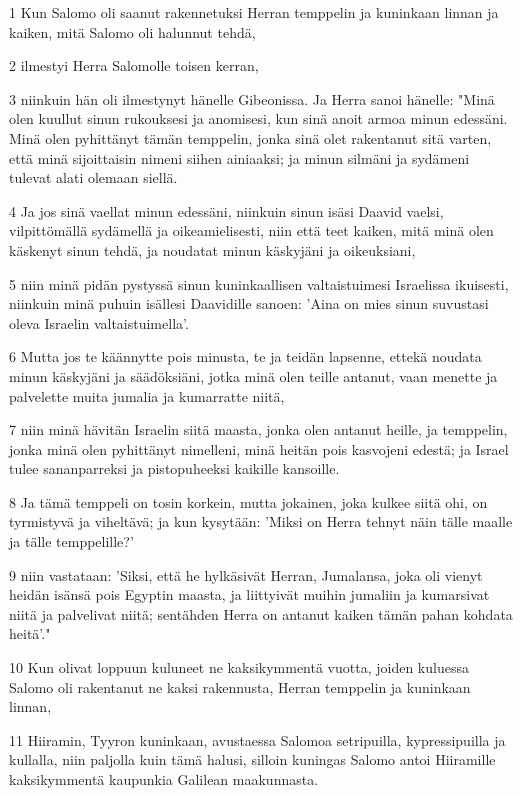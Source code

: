 \par 1 Kun Salomo oli saanut rakennetuksi Herran temppelin ja kuninkaan linnan ja kaiken, mitä Salomo oli halunnut tehdä,
\par 2 ilmestyi Herra Salomolle toisen kerran,
\par 3 niinkuin hän oli ilmestynyt hänelle Gibeonissa. Ja Herra sanoi hänelle: "Minä olen kuullut sinun rukouksesi ja anomisesi, kun sinä anoit armoa minun edessäni. Minä olen pyhittänyt tämän temppelin, jonka sinä olet rakentanut sitä varten, että minä sijoittaisin nimeni siihen ainiaaksi; ja minun silmäni ja sydämeni tulevat alati olemaan siellä.
\par 4 Ja jos sinä vaellat minun edessäni, niinkuin sinun isäsi Daavid vaelsi, vilpittömällä sydämellä ja oikeamielisesti, niin että teet kaiken, mitä minä olen käskenyt sinun tehdä, ja noudatat minun käskyjäni ja oikeuksiani,
\par 5 niin minä pidän pystyssä sinun kuninkaallisen valtaistuimesi Israelissa ikuisesti, niinkuin minä puhuin isällesi Daavidille sanoen: 'Aina on mies sinun suvustasi oleva Israelin valtaistuimella'.
\par 6 Mutta jos te käännytte pois minusta, te ja teidän lapsenne, ettekä noudata minun käskyjäni ja säädöksiäni, jotka minä olen teille antanut, vaan menette ja palvelette muita jumalia ja kumarratte niitä,
\par 7 niin minä hävitän Israelin siitä maasta, jonka olen antanut heille, ja temppelin, jonka minä olen pyhittänyt nimelleni, minä heitän pois kasvojeni edestä; ja Israel tulee sananparreksi ja pistopuheeksi kaikille kansoille.
\par 8 Ja tämä temppeli on tosin korkein, mutta jokainen, joka kulkee siitä ohi, on tyrmistyvä ja viheltävä; ja kun kysytään: 'Miksi on Herra tehnyt näin tälle maalle ja tälle temppelille?'
\par 9 niin vastataan: 'Siksi, että he hylkäsivät Herran, Jumalansa, joka oli vienyt heidän isänsä pois Egyptin maasta, ja liittyivät muihin jumaliin ja kumarsivat niitä ja palvelivat niitä; sentähden Herra on antanut kaiken tämän pahan kohdata heitä'."
\par 10 Kun olivat loppuun kuluneet ne kaksikymmentä vuotta, joiden kuluessa Salomo oli rakentanut ne kaksi rakennusta, Herran temppelin ja kuninkaan linnan,
\par 11 Hiiramin, Tyyron kuninkaan, avustaessa Salomoa setripuilla, kypressipuilla ja kullalla, niin paljolla kuin tämä halusi, silloin kuningas Salomo antoi Hiiramille kaksikymmentä kaupunkia Galilean maakunnasta.
